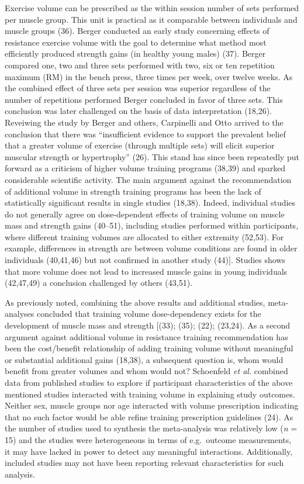 \documentclass[twoside,10pt]{gihclass} %
\begin{document}
Exercise volume can be prescribed as the within session number of sets performed per muscle group. This unit is practical as it comparable between individuals and muscle groups (36).
Berger conducted an early study concerning effects of resistance exercise volume with the goal to determine what method most efficiently produced strength gains (in healthy young males) (37). Berger compared one, two and three sets performed with two, six or ten repetition maximum (RM) in the bench press, three times per week, over twelve weeks. As the combined effect of three sets per session was superior regardless of the number of repetitions performed Berger concluded in favor of three sets. This conclusion was later challenged on the basis of data interpretation
(18,26).
Reveiwing the study by Berger and others, Carpinelli and Otto arrived to the conclusion that there was ``insufficient evidence to support the prevalent belief that a greater volume of exercise (through multiple sets) will elicit superior muscular strength or hypertrophy'' (26). This stand has since been repeatedly put forward as a criticism of higher volume training programs
(38,39) and sparked considerable scientific activity. The main argument against the recommendation of additional volume in strength training programs has been the lack of statistically significant results in single studies (18,38).
Indeed, individual studies do not generally agree on dose-dependent effects of training volume on muscle mass and strength gains
(40--51),
including studies performed within participants, where different training volumes are allocated to either extremity
(52,53).
For example, differences in strength are between volume conditions are found in older individuals
(40,41,46)
but not confirmed in another study
(44){]}.
Studies shows that more volume does not lead to increased muscle gains in young individuals
(42,47,49)
a conclusion challenged by others
(43,51).

As previously noted, combining the above results and additional studies, meta-analyses concluded that training volume dose-dependency exists for the development of muscle mass and strength
{[}(33);
(35);
(22);
(23,24).
As a second argument against additional volume in resistance training recommendation has been the cost/benefit relationship of adding training volume without meaningful or substantial additional gains
(18,38),
a subsequent question is, whom would benefit from greater volumes and whom would not?
Schoenfeld \emph{et al.} combined data from published studies to explore if participant characteristics of the above mentioned studies interacted with training volume in explaining study outcomes. Neither sex, muscle groups nor age interacted with volume prescription indicating that no such factor would be able refine training prescription guidelines
(24).
As the number of studies used to synthesis the meta-analysis was relatively low (\emph{n} = 15) and the studies were heterogeneous in terms of e.g.~outcome measurements, it may have lacked in power to detect any meaningful interactions. Additionally, included studies may not have been reporting relevant characteristics for such analysis.
\end{document}
